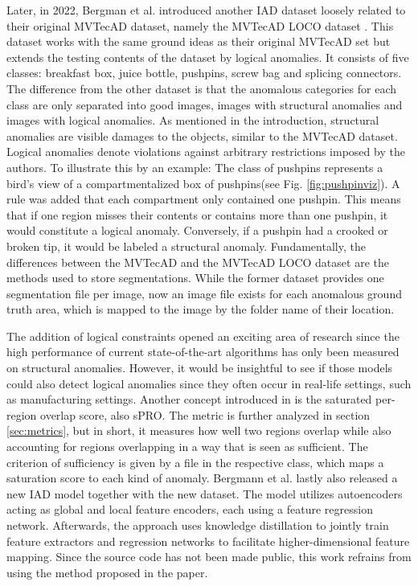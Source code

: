 Later, in 2022, Bergman et al. introduced another IAD dataset loosely related to their original MVTecAD dataset, namely the MVTecAD LOCO dataset \cite{LOCODentsAndScratchesBergmann2022}. 
This dataset works with the same ground ideas as their original MVTecAD set but extends the testing contents of the dataset by logical anomalies. 
It consists of five classes: breakfast box, juice bottle, pushpins, screw bag and splicing connectors. The difference from the other dataset is that the anomalous categories for each class are only separated into good images, images with structural anomalies 
and images with logical anomalies. As mentioned in the introduction, structural anomalies are visible damages to the objects, similar to the MVTecAD dataset. Logical anomalies denote violations against arbitrary restrictions 
imposed by the authors. To illustrate this by an example: The class of pushpins represents a bird's view of a compartmentalized box of pushpins(see Fig. \ref{fig:pushpinviz}). A rule was added 
that each compartment only contained one pushpin. This means that if one region misses their contents or contains more than one pushpin, it would constitute a logical anomaly. Conversely, if a pushpin had a crooked or broken tip, it would be labeled a structural anomaly. Fundamentally, the differences between the 
MVTecAD and the MVTecAD LOCO dataset are the methods used to store segmentations. While the former dataset provides one segmentation file per image, now an image file exists for each anomalous ground truth area, which is mapped to the image by the folder name of their location.




The addition of logical constraints opened an exciting area of research since the high performance 
of current state-of-the-art algorithms has only been measured on structural anomalies. However, it would be insightful to see if those models could also detect logical anomalies since they often occur 
in real-life settings, such as manufacturing settings. Another concept introduced in \cite{LOCODentsAndScratchesBergmann2022} is the 
saturated per-region overlap score, also sPRO. The metric is further analyzed in section \ref{sec:metrics}, but in short, it measures how well two regions overlap while also accounting for regions overlapping in a way that is seen as sufficient. The criterion of 
sufficiency is given by a file in the respective class, which maps a saturation score to each kind of anomaly.
Bergmann et al.\cite{LOCODentsAndScratchesBergmann2022} lastly also released a new IAD model together with the new dataset. The model utilizes autoencoders acting 
as global and local feature encoders, each using a feature regression network. Afterwards, the approach uses knowledge distillation to jointly train 
feature extractors and regression networks to facilitate higher-dimensional feature mapping. Since the source code has not been made public, 
this work refrains from using the method proposed in the paper.


